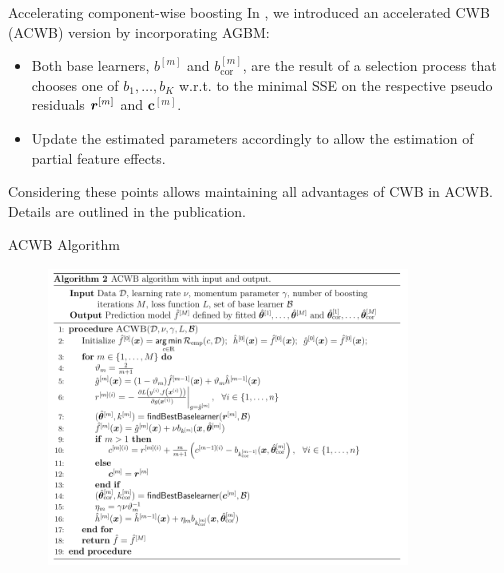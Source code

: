\documentclass[t,10pt]{beamer}
\begin{document}
\begin{frame}{Accelerating component-wise boosting}
  In \citet{schalk2022accelerated}, we introduced an accelerated CWB (ACWB)
  version by incorporating AGBM:

  \begin{itemize}
    \item
      Both base learners, \(b^{[m]}\) and \(b^{[m]}_{\text{cor}}\), are the
      result of a selection process that chooses one of \(b_1, \dots, b_K\)
      w.r.t. to the minimal SSE on the respective pseudo residuals \(\bm{r}^{[m]}\)
      and \(\bm{c}^{[m]}\).
    \item
      Update the estimated parameters accordingly to allow the estimation of
      partial feature effects.
  \end{itemize}
  Considering these points allows maintaining all advantages of CWB in
  ACWB. Details are outlined in the publication.
\end{frame}

\begin{frame}{ACWB Algorithm}
   \begin{figure}
       \centering
       \includegraphics[width=0.85\textwidth]{figures/acwb.png}
   \end{figure} 
\end{frame}
\end{document}
